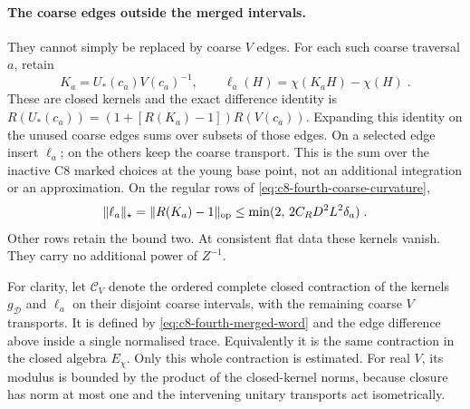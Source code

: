 \documentclass[11pt]{article}
\begin{document}
\paragraph{The coarse edges outside the merged intervals.}
They cannot simply be replaced by coarse $V$ edges. For each
such coarse traversal $a$, retain
\begin{equation}\label{eq:c8-fourth-zero-root}
    K_a=U_*(c_a)V(c_a)^{-1},\qquad
    \ell_a(H)=\chi(K_aH)-\chi(H)\;.
\end{equation}
These are closed kernels and the exact difference identity is
$R(U_*(c_a))=(1+[R(K_a)-1])R(V(c_a))$.
Expanding this identity on the unused coarse edges sums over
subsets of those edges. On a selected edge insert $\ell_a$;
on the others keep the coarse transport. This is the sum over
the inactive C8 marked choices at the young base point, not
an additional integration or an approximation.
On the regular rows of
\eqref{eq:c8-fourth-coarse-curvature},
\begin{equation}\label{eq:c8-fourth-zero-root-bound}
    \|\ell_a\|_\star
        =\|R(K_a)-1\|_{\rm op}
        \leq\min(2,\,2C_RD^2L^2\delta_a)\;.
\end{equation}
Other rows retain the bound two. At consistent flat data these
kernels vanish. They carry no additional power of $Z^{-1}$.

For clarity, let $\mathcal C_V$ denote the ordered complete
closed contraction of the kernels $g_{\mathcal D}$ and
$\ell_a$ on their disjoint coarse intervals, with the
remaining coarse $V$ transports. It is defined by
\eqref{eq:c8-fourth-merged-word} and the edge difference above
inside a single normalised trace. Equivalently it is the same
contraction in the closed algebra $E_\chi$. Only this whole
contraction is estimated. For real $V$, its modulus is bounded
by the product of the closed-kernel norms, because closure has
norm at most one and the intervening unitary transports act
isometrically.
\end{document}
